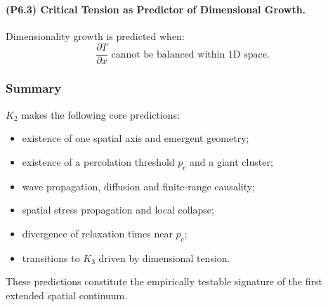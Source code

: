 \paragraph{(P6.3) Critical Tension as Predictor of Dimensional Growth.}
Dimensionality growth is predicted when:
\[
\frac{\partial T}{\partial x} \text{ cannot be balanced within 1D space}.
\]

\subsubsection{Summary}

$K_2$ makes the following core predictions:

\begin{itemize}
    \item existence of one spatial axis and emergent geometry;
    \item existence of a percolation threshold $p_c$ and a giant cluster;
    \item wave propagation, diffusion and finite-range causality;
    \item spatial stress propagation and local collapse;
    \item divergence of relaxation times near $p_c$;
    \item transitions to $K_3$ driven by dimensional tension.
\end{itemize}

These predictions constitute the empirically testable signature of the
first extended spatial continuum.
